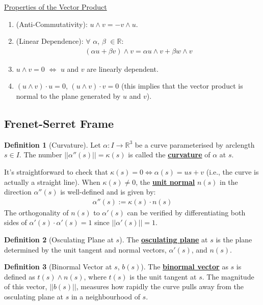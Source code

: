 \documentclass[11pt]{scrartcl}
\newcommand{\R}[0]{\mathbb{R}}
\theoremstyle{definition}
\newtheorem{definition}{Definition}
\theoremstyle{remark}
\newcommand{\dfn}[1]{\textbf{\underline{#1}}}
\begin{document}
{\underline{Properties of the Vector Product} 
\begin{enumerate}[noitemsep]
	\item (Anti-Commutativity): $u \wedge v = -v \wedge u$. 
	\item (Linear Dependence): $\forall$ $\alpha$, $\beta$ $\in \R$: 
	\begin{align*}
		(\alpha u + \beta v) \wedge v = \alpha u \wedge v + \beta w \wedge v
	\end{align*}
	\item $u \wedge v = 0$ $\iff$ $u$ and $v$ are linearly dependent. 
	\item $(u \wedge v) \cdot u =0$, $(u \wedge v) \cdot v =0$ (this implies that the vector product is normal to the plane generated by $u$ and $v$). 
\end{enumerate}

\subsection{Frenet-Serret Frame} %

\begin{definition}[Curvature]
	Let $\alpha: I \rightarrow \R^3$ be a curve parameterised by arclength $s \in I$. The number $|| \alpha''(s) || = \kappa (s)$ is called the \dfn{curvature} of $\alpha$ at $s$. 
\end{definition}
It's straightforward to check that $\kappa(s) = 0 \iff \alpha(s) = us + v$ (i.e., the curve is actually a straight line). When $\kappa(s) \neq 0$, the \dfn{unit normal} $n(s)$ in the direction $\alpha''(s)$ is well-defined and is given by: 
\begin{align*}
	\alpha''(s) := \kappa(s) \cdot n(s)
\end{align*}
The orthogonality of $n(s)$ to $\alpha'(s)$ can be verified by differentiating both sides of $\alpha'(s) \cdot \alpha'(s) = 1$ since $||\alpha'(s)|| =1$. 

\begin{definition}[Osculating Plane at $s$]
	The \dfn{osculating plane} at $s$ is the plane determined by the unit tangent and normal vectors, $\alpha'(s)$, and $n(s)$. 
\end{definition}

\begin{definition}[Binormal Vector at $s$, $b(s)$] 
	The \dfn{binormal vector} as $s$ is defined as $t(s) \wedge n(s)$, where $t(s)$ is the unit tangent at $s$. The magnitude of this vector, $||b(s)||$, measures how rapidly the curve pulls away from the osculating plane at $s$ in a neighbourhood of $s$. 
\end{definition}

}
\end{document}
